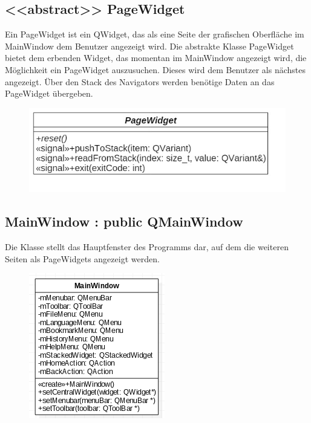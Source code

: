 \subsection*{<<abstract>> PageWidget}
Ein PageWidget ist ein QWidget, das als eine Seite der grafischen Oberfläche im MainWindow dem Benutzer angezeigt wird. Die abstrakte Klasse PageWidget bietet dem erbenden Widget, das momentan im MainWindow angezeigt wird, die Möglichkeit ein PageWidget auszusuchen. Dieses wird dem Benutzer als nächstes angezeigt. Über den Stack des Navigators werden benötige Daten an das PageWidget übergeben.

\begin{figure}[H]
\includegraphics[scale=0.5]{img/Klassendiagramm/Klassen/View/PageWidget}
\label{fig:pageWidget}
\end{figure}

\subsection*{MainWindow : public QMainWindow}
Die Klasse stellt das Hauptfenster des Programms dar, auf dem die weiteren Seiten als PageWidgets angezeigt werden.

\begin{figure}[H]
	\centering
	\includegraphics[scale=0.5]{img/Klassendiagramm/Klassen/View/MainWindow}
	\label{fig:mainWindow}
\end{figure}

